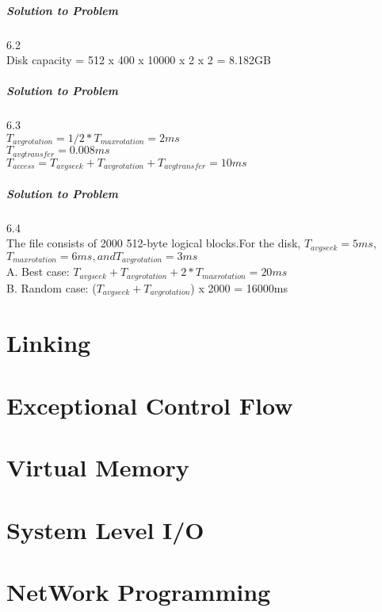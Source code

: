 \documentclass{report}
\begin{document}
\paragraph{Solution to Problem } 6.2\\
Disk capacity = 512 x 400 x 10000 x 2 x 2 = 8.182GB
\paragraph{Solution to Problem } 6.3\\
$T_{avg rotation} = 1/2 * T_{max rotation} = 2ms$ \\
$T_{avg transfer} = 0.008ms$ \\
$T_{access} = T_{avg seek} + T_{avg rotation} + T_{avg transfer} = 10ms$ 
\paragraph{Solution to Problem } 6.4\\
The file consists of 2000 512-byte logical blocks.For the disk, $T_{avg seek} = 5ms$, $T_{max rotation} = 6ms, and T_{avg rotation} = 3ms$ \\
A. Best case:  $T_{avg seek} + T_{avg rotation} + 2 * T_{max rotation} = 20ms $ \\
B. Random case: ($T_{avg seek} + T_{avg rotation}$) x 2000 = 16000ms

















\chapter{Linking}
\chapter{Exceptional Control Flow}
\chapter{Virtual Memory}
\chapter{System Level I/O}
\chapter{NetWork Programming}
\end{document}
